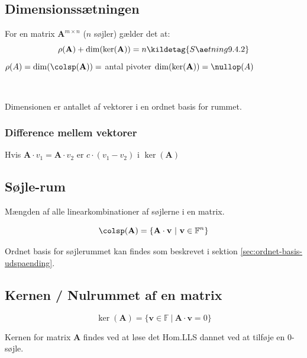 \subsection{Dimensionssætningen}
For en matrix \( \mathbf{A}^{m \times n} \) ($n$ søjler) gælder det at:
\[
    \rho(\mathbf{A}) + \dim(\ker(\mathbf{A})) = n \kildetag{Sætning 9.4.2}
\]
$\rho(A) = \dim(\colsp(\mathbf{A})) =$ antal pivoter \hfill $\dim(\ker(\mathbf{A})) = \nullop(A)$

\

Dimensionen er antallet af vektorer i en ordnet basis for rummet.

\subsubsection{Difference mellem vektorer}
Hvis \(\mathbf{A} \cdot v_1 = \mathbf{A} \cdot v_2\) er \(c \cdot (v_1-v_2)\) i \(\ker(\mathbf{A})\) 


\subsection{Søjle-rum}
\label{sec:soejlerum}

Mængden af alle linearkombinationer af søjlerne i en matrix.

\[
    \colsp(\mathbf{A}) = \{ \mathbf{A} \cdot \mathbf{v} \ | \ \mathbf{v} \in \mathbb{F}^n \}
\]

Ordnet basis for søjlerummet kan findes som beskrevet i sektion \ref{sec:ordnet-basis-udspaending}.

\subsection{Kernen / Nulrummet af en matrix}
\label{sec:kerne}

\[ \ker(\mathbf{A}) = \{ \mathbf{v} \in \mathbb{F} \ | \ \mathbf{A} \cdot \mathbf{v} = 0 \} \]

Kernen for matrix \textbf{A} findes ved at løse det Hom.LLS dannet ved at tilføje en 0-søjle.


